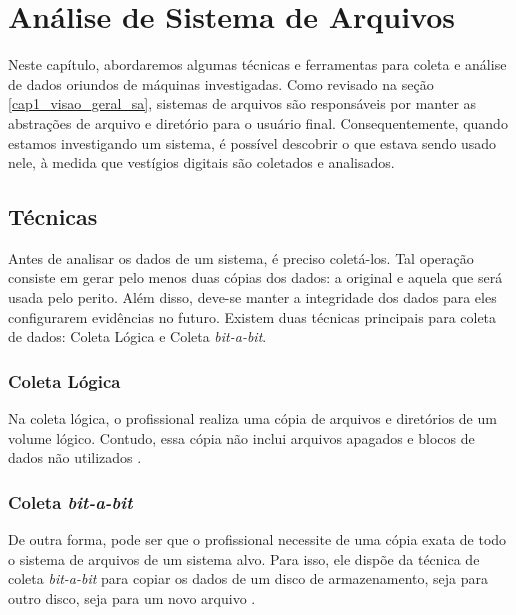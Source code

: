 \section{Análise de Sistema de Arquivos}
    
    \vspace{10.5cm}
    
    \hspace{1cm}
    Neste capítulo, abordaremos algumas técnicas e ferramentas para coleta e análise de dados oriundos de máquinas investigadas. Como revisado na seção \ref{cap1_visao_geral_sa}, sistemas de arquivos são responsáveis por manter as abstrações de arquivo e diretório para o usuário final. Consequentemente, quando estamos investigando um sistema, é possível descobrir o que estava sendo usado nele, à medida que vestígios digitais são coletados e analisados.
    
    \subsection{Técnicas}
    
    \hspace{1cm}
    Antes de analisar os dados de um sistema, é preciso coletá-los. Tal operação consiste em gerar pelo menos duas cópias dos dados: a original e aquela que será usada pelo perito. Além disso, deve-se manter a integridade dos dados para eles configurarem evidências no futuro. Existem duas técnicas principais para coleta de dados: Coleta Lógica e Coleta \textit{bit-a-bit}.
    
    \subsubsection{Coleta Lógica}
    
    \hspace{1cm}
    Na coleta lógica, o profissional realiza uma cópia de arquivos e diretórios de um volume lógico. Contudo, essa cópia não inclui arquivos apagados e blocos de dados não utilizados \cite{kent2006}.
    
    \subsubsection{Coleta \textit{bit-a-bit}}
    
    \hspace{1cm}
    De outra forma, pode ser que o profissional necessite de uma cópia exata de todo o sistema de arquivos de um sistema alvo. Para isso, ele dispõe da técnica de coleta \textit{bit-a-bit} para copiar os dados de um disco de armazenamento, seja para outro disco, seja para um novo arquivo \cite{kent2006}.
    
